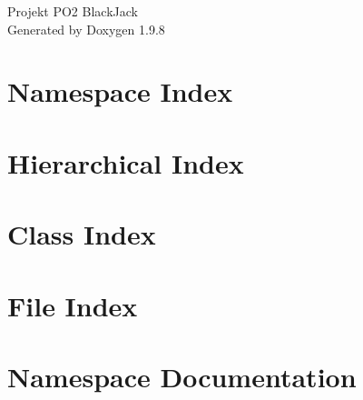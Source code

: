 \documentclass[twoside]{book}
\newcommand{\+}{\discretionary{\mbox{\scriptsize$\hookleftarrow$}}{}{}}
\newcommand{\clearemptydoublepage}{%
    \newpage{\pagestyle{empty}\cleardoublepage}%
  }
\begin{document}
  \raggedbottom
    \hypersetup{pageanchor=false,
                bookmarksnumbered=true,
                pdfencoding=unicode
               }
  \begin{titlepage}
  \vspace*{7cm}
  \begin{center}%
  {\Large Projekt PO2 Black\+Jack}\\
  \vspace*{1cm}
  {\large Generated by Doxygen 1.9.8}\\
  \end{center}
  \end{titlepage}
  \clearemptydoublepage
  \tableofcontents
  \clearemptydoublepage
  \hypersetup{pageanchor=true}
\chapter{Namespace Index}

\chapter{Hierarchical Index}

\chapter{Class Index}

\chapter{File Index}

\chapter{Namespace Documentation}






\end{document}

